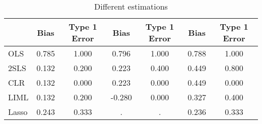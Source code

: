 \begin{table}[htbp]\centering
\caption{Different estimations}
\begin{tabular}{l*{6}{c}}
\toprule
            &        Bias&Type 1 Error&        Bias&Type 1 Error&        Bias&Type 1 Error\\
\midrule
OLS         &       0.785&       1.000&       0.796&       1.000&       0.788&       1.000\\
\addlinespace
2SLS        &       0.132&       0.200&       0.223&       0.400&       0.449&       0.800\\
\addlinespace
CLR         &       0.132&       0.000&       0.223&       0.000&       0.449&       0.000\\
\addlinespace
LIML        &       0.132&       0.200&      -0.280&       0.000&       0.327&       0.400\\
\addlinespace
Lasso       &       0.243&       0.333&           .&           .&       0.236&       0.333\\
\bottomrule
\end{tabular}
\end{table}
